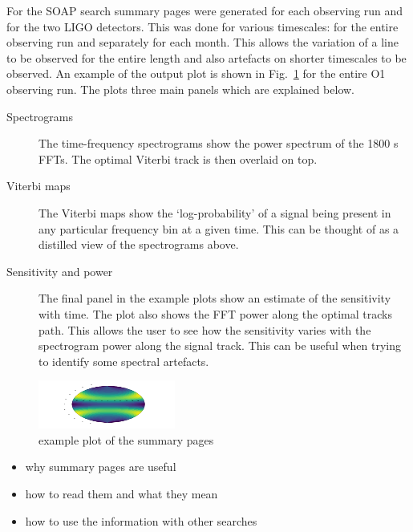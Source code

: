 For the SOAP search summary pages were generated for each observing run and for the two \ac{LIGO} detectors. 
This was done for various timescales: for the entire observing run and separately for each month.
This allows the variation of a line to be observed for the entire length and also artefacts on shorter timescales to be observed.
An example of the output plot is shown in Fig.~\ref{detchar:summary:plots} for the entire O1 observing run.
The plots three main panels which are explained below.
\begin{description}
	\item[Spectrograms] The time-frequency spectrograms show the power spectrum of the 1800 s \acp{FFT}. The optimal Viterbi track is then overlaid on top.
	
	\item[Viterbi maps] The Viterbi maps show the `log-probability' of a signal being present in any particular frequency bin at a given time. This can be thought of as a distilled view of the spectrograms above.
	
	\item[Sensitivity and power] The final panel in the example plots show an estimate of the sensitivity with time. The plot also shows the \ac{FFT} power along the optimal tracks path. This allows the user to see how the sensitivity varies with the spectrogram power along the signal track. This can be useful when trying to identify some spectral artefacts.
\end{description}

\begin{figure}
	\centering
	\includegraphics[width=\textwidth]{testimg.png}
	\caption{example plot of the summary pages}
	\label{detchar:summary:plots}
\end{figure}
\begin{itemize}
    \item why summary pages are useful 
    \item how to read them and what they mean
    \item how to use the information with other searches
\end{itemize}
